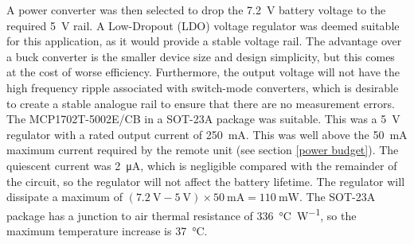 
A power converter was then selected to drop the \SI{7.2}{\volt} battery voltage to the required \SI{5}{\volt} rail. A Low-Dropout (LDO) voltage regulator was deemed suitable for this application, as it would provide a stable voltage rail. The advantage over a buck converter is the smaller device size and design simplicity, but this comes at the cost of worse efficiency. Furthermore, the output voltage will not have the high frequency ripple associated with switch-mode converters, which is desirable to create a stable analogue rail to ensure that there are no measurement errors. The MCP1702T-5002E/CB \cite{mcp1702} in a SOT-23A package was suitable. This was a \SI{5}{\volt} regulator with a rated output current of \SI{250}{\milli\ampere}. This was well above the \SI{50}{\milli\ampere} maximum current required by the remote unit (see section \ref{power budget}). The quiescent current was \SI{2}{\micro\ampere}, which is negligible compared with the remainder of the circuit, so the regulator will not affect the battery lifetime. The regulator will dissipate a maximum of $(\SI{7.2}{\volt}-\SI{5}{\volt})\times\SI{50}{\milli\ampere}=\SI{110}{\milli\watt}$. The SOT-23A package has a junction to air thermal resistance of \SI{336}{\celsius\per\watt}, so the maximum temperature increase is \SI{37}{\celsius}.\\


